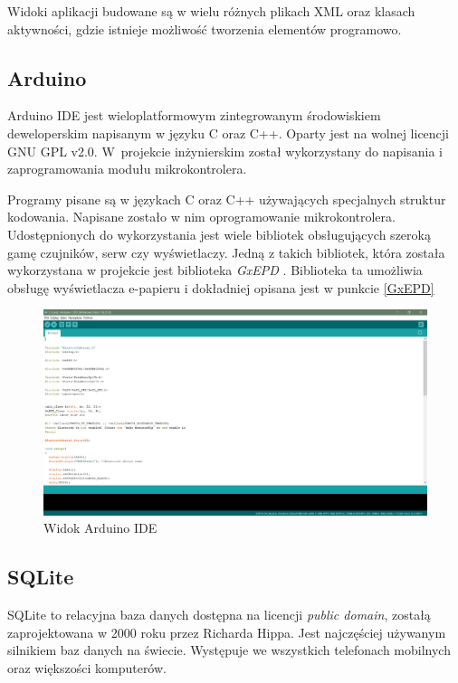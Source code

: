 \documentclass[a4paper,12pt, twoside]{article}
\begin{document}
    	Widoki aplikacji budowane są w wielu różnych plikach XML oraz klasach aktywności, gdzie istnieje możliwość tworzenia elementów programowo.
    	
    	\subsection{Arduino}
    	Arduino IDE jest wieloplatformowym zintegrowanym środowiskiem deweloperskim napisanym w języku C oraz C++. Oparty jest na wolnej licencji GNU GPL v2.0. W~projekcie inżynierskim został wykorzystany do napisania i zaprogramowania modułu mikrokontrolera.
    	
    	Programy pisane są w językach C oraz C++ używających specjalnych struktur kodowania. Napisane zostało w nim oprogramowanie mikrokontrolera. Udostępnionych do wykorzystania jest wiele bibliotek obsługujących szeroką gamę czujników, serw czy wyświetlaczy. Jedną z takich bibliotek, która została wykorzystana w projekcie jest biblioteka \textit{GxEPD} \cite{gxepd}. Biblioteka ta umożliwia obsługę wyświetlacza e-papieru i dokładniej opisana jest w punkcie \ref{GxEPD}
    	
    	\begin{figure}[H]
    			\includegraphics[width=1\textwidth]{images/rys3_arduino.png}
    			\caption{Widok Arduino IDE}
                \label{fig:arduinoide}
    	\end{figure}
    	
    	\subsection{SQLite}
    	SQLite to relacyjna baza danych dostępna na licencji \textit{public domain}\cite{publicdomain}, zostałą zaprojektowana w 2000 roku przez Richarda Hippa. Jest najczęściej używanym silnikiem baz danych na świecie. Występuje we wszystkich telefonach mobilnych oraz większości komputerów. 
    	
\end{document}
